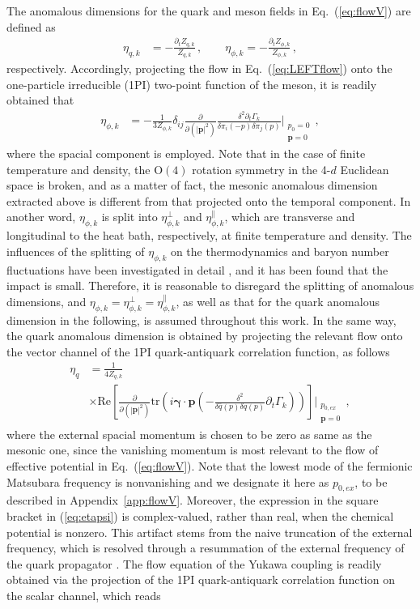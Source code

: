 \documentclass[%
reprint,
superscriptaddress,
showpacs,preprintnumbers,
amsmath,amssymb,
aps,
prd,
]{revtex4-1}
\def\Eq#1{Eq.~(\ref{#1})}
\def\eq#1{(\ref{#1})}
\def\app#1{Appendix~\ref{#1}}
\begin{document}
	The anomalous dimensions for the quark and meson fields in \Eq{eq:flowV} are defined as
	\begin{align}
		\eta_{q,k}&=-\frac{\partial_t Z_{q,k}}{Z_{q,k}}\,,\qquad
		\eta_{\phi,k}=-\frac{\partial_t Z_{\phi,k}}{Z_{\phi,k}}\,,
	\end{align}
	respectively. Accordingly, projecting the flow in \Eq{eq:LEFTflow} onto the one-particle irreducible (1PI) two-point function of the meson, it is readily obtained that 
	\begin{align}
		\eta_{\phi,k}&=-\frac{1}{3Z_{\phi,k}}\delta_{ij}\frac{\partial}{\partial (|\bm{p}|^2)}\frac{\delta^2 \partial_t \Gamma_k}{\delta \pi_i(-p) \delta \pi_j(p)}\Bigg|_{\substack{p_0=0\\ \bm{p}=0}}\,,\label{eq:etaphi}
	\end{align}
	where the spacial component is employed. Note that in the case of finite temperature and density, the $\mathrm{O}(4)$ rotation symmetry in the 4-$d$ Euclidean space is broken, and as a matter of fact, the mesonic anomalous dimension extracted above is different from that projected onto the temporal component. In another word, $\eta_{\phi,k}$ is split into $\eta_{\phi,k}^{\perp}$ and $\eta_{\phi,k}^{\parallel}$, which are transverse and longitudinal to the heat bath, respectively, at finite temperature and density. The influences of the splitting of $\eta_{\phi,k}$ on the thermodynamics and baryon number fluctuations have been investigated in detail \cite{Yin:2019ebz}, and it has been found that the impact is small. Therefore, it is reasonable to disregard the splitting of anomalous dimensions, and $\eta_{\phi,k}=\eta_{\phi,k}^{\perp}=\eta_{\phi,k}^{\parallel}$, as well as that for the quark anomalous dimension in the following, is assumed throughout this work. In the same way, the quark anomalous dimension is obtained by projecting the relevant flow onto the vector channel of the 1PI quark-antiquark correlation function, as follows
	\begin{align}
		\eta_{q}&=\frac{1}{4 Z_{q,k}}\nonumber\\[2ex]
		&\times\mathrm{Re}\left[\frac{\partial}{\partial (|\bm{p}|^2)}\mathrm{tr}
		\left(i \bm{\gamma}\cdot\bm{p}\left(-\frac{\delta^2}{\delta\bar{q}(p)
			\delta q(p)}\partial_t \Gamma_k\right)\right)\right]\Bigg|_{\substack{p_{0,ex}\\ \bm{p}=0}}\,,  \label{eq:etapsi}
	\end{align}
	where the external spacial momentum is chosen to be zero as same as the mesonic one, since the vanishing momentum is most relevant to the flow of effective potential in \Eq{eq:flowV}. Note that the lowest mode of the fermionic Matsubara frequency is nonvanishing and we designate it here as $p_{0,ex}$, to be described in \app{app:flowV}. Moreover, the expression in the square bracket in \eq{eq:etapsi} is complex-valued, rather than real, when the chemical potential is nonzero. This artifact stems from the naive truncation of the external frequency, which is resolved through a resummation of the external frequency of the quark propagator \cite{Fu:2016tey}. The flow equation of the Yukawa coupling is readily obtained via the projection of the 1PI quark-antiquark correlation function on the scalar channel, which reads
\end{document}
